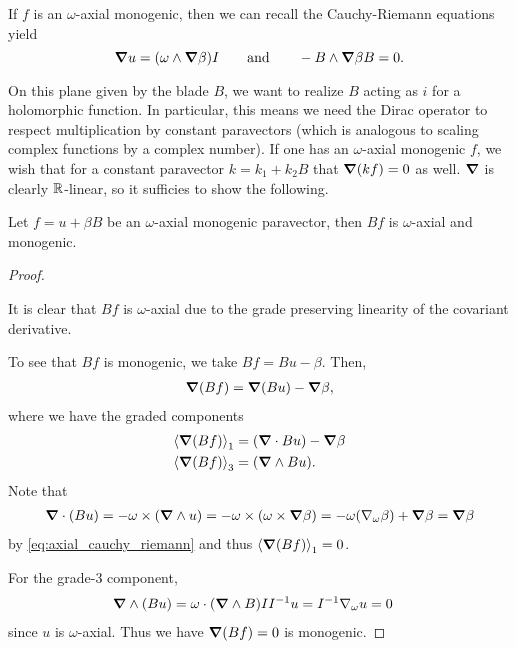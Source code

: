 If $f$ is an $\omega$-axial monogenic, then we can recall the Cauchy-Riemann equations yield
\begin{equation}
\label{eq:axial_cauchy_riemann}
\grad u = (\omega \wedge \grad \beta)I \qquad \textrm{and} \qquad - B \wedge \grad \beta B = 0.
\end{equation}

On this plane given by the blade $B$, we want to realize $B$ acting as $i$ for a holomorphic function. In particular, this means we need the Dirac operator to respect multiplication by constant paravectors (which is analogous to scaling complex functions by a complex number). If one has an $\omega$-axial monogenic $f$, we wish that for a constant paravector $k=k_1 + k_2 B$ that $\grad (kf)=0$ as well. $\grad$ is clearly $\R$-linear, so it sufficies to show the following.

\begin{lemma}
    \label{lem:mult_by_i_monogenic}
    Let $f=u+\beta B$ be an $\omega$-axial monogenic paravector, then $B f$ is $\omega$-axial and monogenic.
\end{lemma}
\begin{proof}~
    
    It is clear that $B f$ is $\omega$-axial due to the grade preserving linearity of the covariant derivative.
    
    To see that $B f$ is monogenic, we take $B  f = B  u - \beta$.  Then,
    \begin{align*}
    \grad (Bf) = \grad (B u) - \grad \beta,
    \end{align*}
    where we have the graded components
    \begin{align*}
        \proj{1}{\grad (B f)} &= (\grad \cdot Bu)  - \grad \beta\\
        \proj{3}{\grad (Bf)} &= (\grad \wedge B u).
    \end{align*}
    Note that
    \begin{align*}
    \grad \cdot (Bu) =  -\omega \times (\grad \wedge u)  =- \omega \times (\omega \times \grad\beta) = -\omega (\nabla_\omega \beta)+\grad \beta = \grad \beta
    \end{align*}
    by \ref{eq:axial_cauchy_riemann} and thus $\proj{1}{\grad (Bf)}=0$. 
    
    For the grade-3 component,
    \begin{align*}
        \grad \wedge (B u) &= \omega \cdot  (\grad \wedge B)II^{-1}u = I^{-1} \nabla_\omega u=0
    \end{align*}
    since $u$ is $\omega$-axial. Thus we have $\grad(B f)=0$ is monogenic.
\end{proof}

